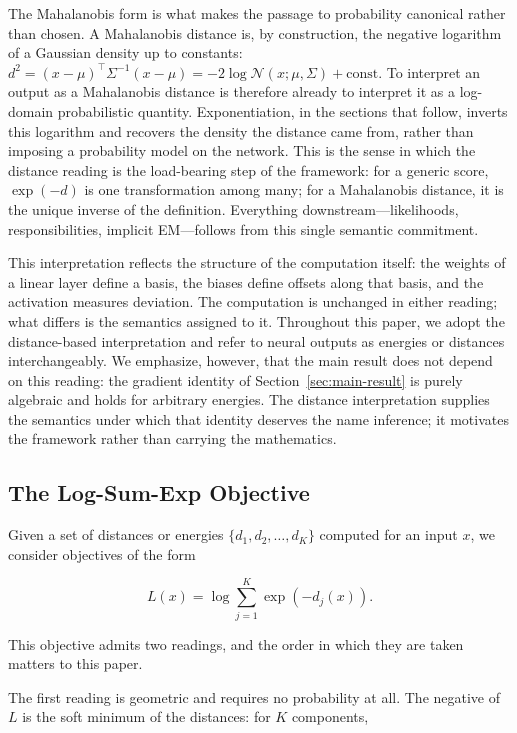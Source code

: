 The Mahalanobis form is what makes the passage to probability canonical rather than chosen. A Mahalanobis distance is, by construction, the negative logarithm of a Gaussian density up to constants: $d^2 = (x-\mu)^\top \Sigma^{-1} (x-\mu) = -2\log \mathcal{N}(x;\mu,\Sigma) + \text{const}$. To interpret an output as a Mahalanobis distance is therefore already to interpret it as a log-domain probabilistic quantity. Exponentiation, in the sections that follow, inverts this logarithm and recovers the density the distance came from, rather than imposing a probability model on the network. This is the sense in which the distance reading is the load-bearing step of the framework: for a generic score, $\exp(-d)$ is one transformation among many; for a Mahalanobis distance, it is the unique inverse of the definition. Everything downstream---likelihoods, responsibilities, implicit EM---follows from this single semantic commitment.

This interpretation reflects the structure of the computation itself: the weights of a linear layer define a basis, the biases define offsets along that basis, and the activation measures deviation. The computation is unchanged in either reading; what differs is the semantics assigned to it. Throughout this paper, we adopt the distance-based interpretation and refer to neural outputs as energies or distances interchangeably. We emphasize, however, that the main result does not depend on this reading: the gradient identity of Section~\ref{sec:main-result} is purely algebraic and holds for arbitrary energies. The distance interpretation supplies the semantics under which that identity deserves the name inference; it motivates the framework rather than carrying the mathematics.

\subsection{The Log-Sum-Exp Objective}
\label{sec:lse}

Given a set of distances or energies $\{d_1, d_2, \ldots, d_K\}$ computed for an input $x$, we consider objectives of the form

\begin{equation}
L(x) = \log \sum_{j=1}^{K} \exp(-d_j(x)).
\end{equation}

This objective admits two readings, and the order in which they are taken matters to this paper.

The first reading is geometric and requires no probability at all. The negative of $L$ is the soft minimum of the distances: for $K$ components,

